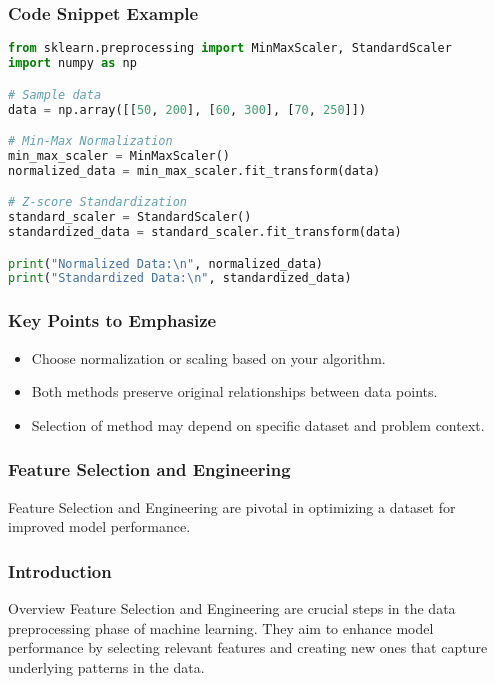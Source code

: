 \documentclass[aspectratio=169]{beamer}
\begin{document}
\begin{frame}[fragile]
    \frametitle{Code Snippet Example}
    \begin{lstlisting}[language=Python]
from sklearn.preprocessing import MinMaxScaler, StandardScaler
import numpy as np

# Sample data
data = np.array([[50, 200], [60, 300], [70, 250]])

# Min-Max Normalization
min_max_scaler = MinMaxScaler()
normalized_data = min_max_scaler.fit_transform(data)

# Z-score Standardization
standard_scaler = StandardScaler()
standardized_data = standard_scaler.fit_transform(data)

print("Normalized Data:\n", normalized_data)
print("Standardized Data:\n", standardized_data)
    \end{lstlisting}
\end{frame}

\begin{frame}
    \frametitle{Key Points to Emphasize}
    \begin{itemize}
        \item Choose normalization or scaling based on your algorithm.
        \item Both methods preserve original relationships between data points.
        \item Selection of method may depend on specific dataset and problem context.
    \end{itemize}
\end{frame}

\begin{frame}[fragile]
    \frametitle{Feature Selection and Engineering}
    Feature Selection and Engineering are pivotal in optimizing a dataset for improved model performance.
\end{frame}

\begin{frame}[fragile]
    \frametitle{Introduction}
    \begin{block}{Overview}
        Feature Selection and Engineering are crucial steps in the data preprocessing phase of machine learning. 
        They aim to enhance model performance by selecting relevant features and creating new ones that capture 
        underlying patterns in the data.
    \end{block}
\end{frame}
\end{document}
